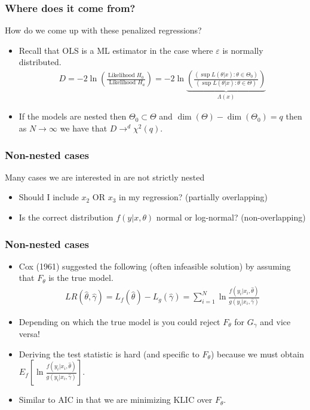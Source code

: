 \begin{frame}
    \frametitle{Where does it come from?}
    How do we come up with these penalized regressions?
    \begin{itemize}
    \item Recall that OLS is a ML estimator in the case where $\varepsilon$ is normally distributed.
    \begin{eqnarray*}
    D = - 2 \ln \left (\frac{\mbox{Likelihood  } H_0}{\mbox{ Likelihood  }H_a} \right) = -2 \ln \underbrace{\left(\frac{(\sup L(\theta | x) : \theta \in \Theta_0)}{(\sup L(\theta | x) : \theta \in \Theta)}\right)}_{\Lambda(x)}
    \end{eqnarray*}
    \item If the models are \alert{nested} then $\Theta_0 \subset \Theta$ and $\dim(\Theta) -\dim(\Theta_0) = q$ then as $N\rightarrow \infty$ we have that $D \rightarrow^d \chi^2(q)$.
    \end{itemize}
\end{frame}
    

\begin{frame}
\frametitle{Non-nested cases}
Many cases we are interested in are \alert{not strictly nested}
\begin{itemize}
\item Should I include $x_2$ OR $x_3$ in my regression? (partially overlapping)
\item Is the correct distribution $f(y | x, \theta)$ normal or log-normal? (non-overlapping)
\end{itemize}
\end{frame}

\begin{frame}
\frametitle{Non-nested cases}
\begin{itemize}
\item Cox (1961) suggested the following (often infeasible solution) by assuming that $F_{\theta}$ is the true model.
\begin{eqnarray*}
LR(\hat{\theta},\hat{\gamma}) = L_f(\hat{\theta}) - L_g (\hat{\gamma}) = \sum_{i=1}^N \ln \frac{f(y_i | x_i, \hat{\theta})}{g(y_i | x_i, \hat{\gamma})}
\end{eqnarray*}
\item Depending on which the true model is you could reject $F_{\theta}$ for $G_{\gamma}$ and vice versa!
\item Deriving the test statistic is hard (and specific to $F_{\theta}$) because we must obtain $E_f [\ln \frac{f(y_i | x_i, \hat{\theta})}{g(y_i | x_i, \hat{\gamma})}]$.
\item Similar to AIC in that we are minimizing KLIC over $F_{\theta}$.
\end{itemize}
\end{frame}

